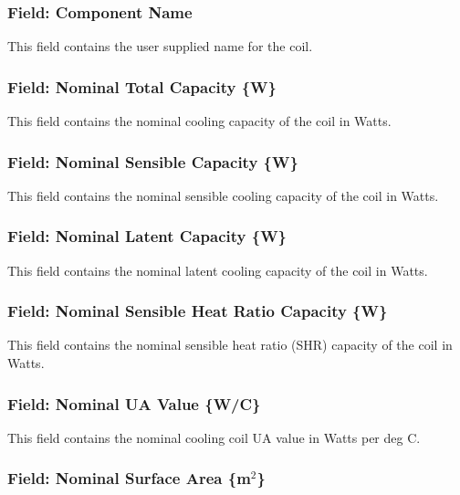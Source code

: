 \subsubsection{Field: Component Name}\label{field-component-name-2}

This field contains the user supplied name for the coil.

\subsubsection{Field: Nominal Total Capacity \{W\}}\label{field-nominal-total-capacity-w-1}

This field contains the nominal cooling capacity of the coil in Watts.

\subsubsection{Field: Nominal Sensible Capacity \{W\}}\label{field-nominal-sensible-capacity-w}

This field contains the nominal sensible cooling capacity of the coil in Watts.

\subsubsection{Field: Nominal Latent Capacity \{W\}}\label{field-nominal-latent-capacity-w}

This field contains the nominal latent cooling capacity of the coil in Watts.

\subsubsection{Field: Nominal Sensible Heat Ratio Capacity \{W\}}\label{field-nominal-sensible-heat-ratio-capacity-w}

This field contains the nominal sensible heat ratio (SHR) capacity of the coil in Watts.

\subsubsection{Field: Nominal UA Value \{W/C\}}\label{field-nominal-ua-value-wc}

This field contains the nominal cooling coil UA value in Watts per deg C.

\subsubsection{Field: Nominal Surface Area \{m\(^{2}\)\}}\label{field-nominal-surface-area-m2}

